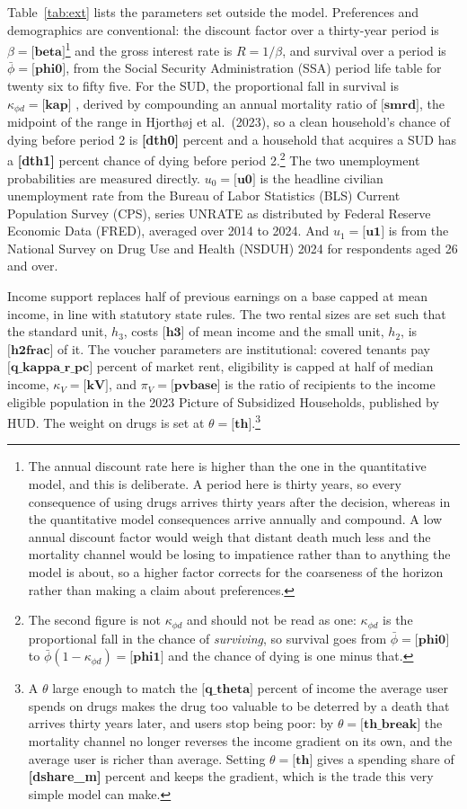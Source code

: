 \documentclass[10pt]{article}
\begin{document}
Table~\ref{tab:ext} lists the parameters set outside the model. Preferences and
demographics are conventional: the discount factor over a thirty-year period
is $\beta = \textbf{[beta]}$\footnote{The annual discount rate here is higher than the one in the
quantitative model, and this is deliberate. A period here is thirty years, so
every consequence of using drugs arrives thirty years after the decision,
whereas in the quantitative model consequences arrive annually and compound. A
low annual discount factor would weigh that distant death much less and the
mortality channel would be losing to impatience rather than to anything the model
is about, so a higher factor corrects for the coarseness of the horizon rather
than making a claim about preferences.} and the gross interest rate is
$R=1/\beta$, and survival over
a period is $\bar\phi = \textbf{[phi0]}$, from the Social Security Administration (SSA) period life table for twenty six to fifty five. For the SUD, the
proportional fall in survival is $\kappa_{\phi d} = \textbf{[kap]}$ , derived by compounding an annual mortality ratio of $\textbf{[smrd]}$, the midpoint of the range in Hjorth\o j et al.\
(2023), so a clean household's chance of dying before period 2 is \textbf{[dth0]}
percent and a household that acquires a SUD has a \textbf{[dth1]} percent chance of
dying before period 2.\footnote{The second figure is not $\kappa_{\phi d}$ and should not be
read as one: $\kappa_{\phi d}$ is the proportional fall in the chance of \emph{surviving}, so
survival goes from $\bar\phi=\textbf{[phi0]}$ to $\bar\phi(1-\kappa_{\phi d})=\textbf{[phi1]}$ and the chance of
dying is one minus that.}
The two unemployment probabilities are measured directly. $u_0 = \textbf{[u0]}$
is the headline civilian unemployment rate from the Bureau of Labor Statistics
(BLS) Current Population Survey (CPS), series UNRATE as distributed by Federal Reserve
Economic Data (FRED), averaged over 2014 to 2024. And $u_1 = \textbf{[u1]}$ is from the
National Survey on Drug Use and Health (NSDUH) 2024 for respondents aged 26 and
over.

Income support replaces half of previous earnings on a base capped at mean
income, in line with statutory state rules. The two rental sizes are set
such that the standard unit, $h_3$, costs $\textbf{[h3]}$ of mean income and the
small unit, $h_2$, is $\textbf{[h2frac]}$ of it. The voucher parameters are institutional: covered
tenants pay $\textbf{[q_kappa_r_pc]}$ percent of market rent, eligibility is capped at half of median income, $\kappa_V = \textbf{[kV]}$, and $\pi_V = \textbf{[pvbase]}$ is the ratio of recipients to the income eligible population in the 2023 Picture of Subsidized
Households, published by HUD. The weight on drugs is set at $\theta = \textbf{[th]}$.\footnote{A $\theta$ large enough to
match the $\textbf{[q_theta]}$ percent of income the average user spends on drugs makes the drug too
valuable to be deterred by a death that arrives thirty years later, and users stop
being poor: by $\theta=\textbf{[th_break]}$ the mortality channel no longer reverses the income
gradient on its own, and the average user is richer than average. Setting $\theta = \textbf{[th]}$ gives a spending share of \textbf{[dshare_m]}
percent and keeps the gradient, which is the trade this very simple model can make.}
\end{document}
